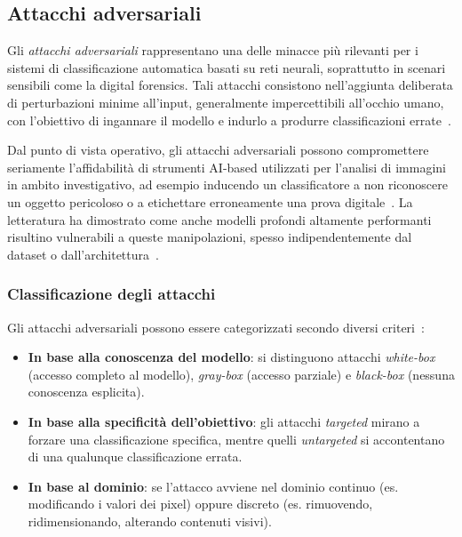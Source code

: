 \subsection{Attacchi adversariali}
\label{sec:attacchi-adversariali}

Gli \textit{attacchi adversariali} rappresentano una delle minacce più rilevanti per i sistemi di classificazione automatica basati su reti neurali, soprattutto in scenari sensibili come la digital forensics. Tali attacchi consistono nell’aggiunta deliberata di perturbazioni minime all’input, generalmente impercettibili all’occhio umano, con l’obiettivo di ingannare il modello e indurlo a produrre classificazioni errate~\cite{szegedy2014intriguing, goodfellow2015explaining}.

Dal punto di vista operativo, gli attacchi adversariali possono compromettere seriamente l'affidabilità di strumenti AI-based utilizzati per l’analisi di immagini in ambito investigativo, ad esempio inducendo un classificatore a non riconoscere un oggetto pericoloso o a etichettare erroneamente una prova digitale~\cite{nowroozi2020phd, barni2018cf}. La letteratura ha dimostrato come anche modelli profondi altamente performanti risultino vulnerabili a queste manipolazioni, spesso indipendentemente dal dataset o dall’architettura~\cite{akhtar2018threat}.

\subsubsection*{Classificazione degli attacchi}

Gli attacchi adversariali possono essere categorizzati secondo diversi criteri~\cite{akhtar2018threat, bhambri2020survey}:

\begin{itemize}
    \item \textbf{In base alla conoscenza del modello}: si distinguono attacchi \textit{white-box} (accesso completo al modello), \textit{gray-box} (accesso parziale) e \textit{black-box} (nessuna conoscenza esplicita).
    \item \textbf{In base alla specificità dell'obiettivo}: gli attacchi \textit{targeted} mirano a forzare una classificazione specifica, mentre quelli \textit{untargeted} si accontentano di una qualunque classificazione errata.
    \item \textbf{In base al dominio}: se l'attacco avviene nel dominio continuo (es. modificando i valori dei pixel) oppure discreto (es. rimuovendo, ridimensionando, alterando contenuti visivi).
\end{itemize}

